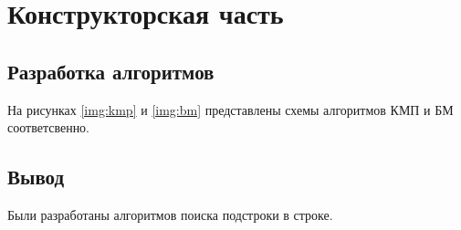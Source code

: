 \chapter{Конструкторская часть}

\section{Разработка алгоритмов}

На рисунках \ref{img:kmp} и \ref{img:bm} представлены схемы алгоритмов КМП и БМ соответсвенно.



\section*{Вывод}

Были разработаны алгоритмов поиска подстроки в строке.
